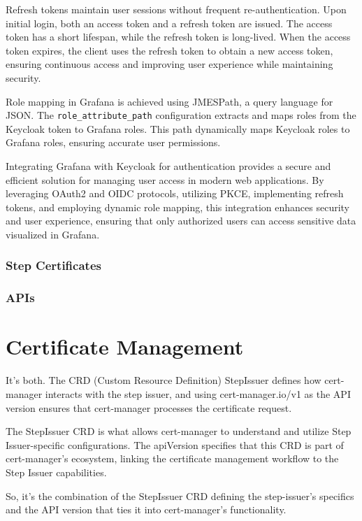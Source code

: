 Refresh tokens maintain user sessions without frequent re-authentication. Upon initial login, both an access token and a refresh token are issued. The access token has a short lifespan, while the refresh token is long-lived. When the access token expires, the client uses the refresh token to obtain a new access token, ensuring continuous access and improving user experience while maintaining security.

Role mapping in Grafana is achieved using JMESPath, a query language for JSON. The \texttt{role\_attribute\_path} configuration extracts and maps roles from the Keycloak token to Grafana roles. This path dynamically maps Keycloak roles to Grafana roles, ensuring accurate user permissions.

Integrating Grafana with Keycloak for authentication provides a secure and efficient solution for managing user access in modern web applications. By leveraging OAuth2 and OIDC protocols, utilizing PKCE, implementing refresh tokens, and employing dynamic role mapping, this integration enhances security and user experience, ensuring that only authorized users can access sensitive data visualized in Grafana.

\subsection{Step Certificates}

\subsection{APIs}

\chapter{Certificate Management}

It’s both. The CRD (Custom Resource Definition) StepIssuer defines how cert-manager interacts with the step issuer, and using cert-manager.io/v1 as the API version ensures that cert-manager processes the certificate request.

The StepIssuer CRD is what allows cert-manager to understand and utilize Step Issuer-specific configurations. The apiVersion specifies that this CRD is part of cert-manager’s ecosystem, linking the certificate management workflow to the Step Issuer capabilities.

So, it’s the combination of the StepIssuer CRD defining the step-issuer's specifics and the API version that ties it into cert-manager’s functionality.

